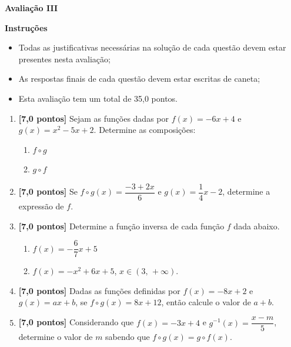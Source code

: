 \documentclass[12pt,a4paper]{article}
\begin{document}
\begin{center}
 \textbf{Avaliação III}
\end{center}

\textbf{Instruções}
\begin{itemize}
 \item Todas as justificativas necessárias na solução de cada questão devem estar presentes nesta avaliação;
 \item As respostas finais de cada questão devem estar escritas de caneta;
 \item Esta avaliação tem um total de 35,0 pontos.
\end{itemize}

\begin{enumerate}
  \item \textbf{[7,0 pontos]} Sejam as funções dadas por $f(x) = -6x + 4$ e $g(x) = x^2 - 5x + 2$.
  Determine as composições:
    \begin{enumerate}
      \item $f\circ g$
      \item $g\circ f$
    \end{enumerate}

  \item \textbf{[7,0 pontos]} Se $f\circ g(x) = \dfrac{-3 + 2x}{6}$ e $g(x) = \dfrac{1}{4}x - 2$,
    determine a expressão de $f$.

  \item \textbf{[7,0 pontos]} Determine a função inversa de cada função $f$ dada abaixo.
    \begin{enumerate}
      \item $f(x) = -\dfrac{6}{7}x + 5$
      \item $f(x) = -x^2 + 6x + 5$, $x \in (3,\,+\infty)$.
    \end{enumerate} 

  \item \textbf{[7,0 pontos]} Dadas as funções definidas por $f(x) = -8x + 2$ e $g(x) = ax + b$, 
  se $f\circ g(x) = 8x + 12$, então calcule o valor de $a + b$.

  \item \textbf{[7,0 pontos]} Considerando que $f(x) = -3x + 4$ e $g^{-1}(x) = \dfrac{x - m}{5}$,
   determine o valor de $m$ sabendo que $f\circ g(x) = g\circ f(x)$.

\end{enumerate}
\end{document}
